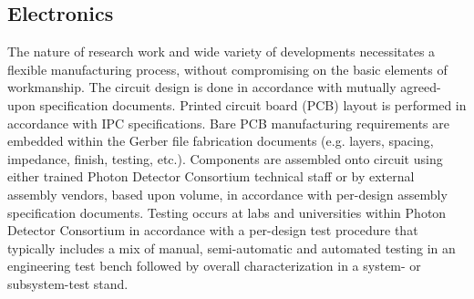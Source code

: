 






\subsection{Electronics}
\label{sec:fdsp-pd-assy-pde}

The nature of research work and wide variety of developments necessitates a flexible manufacturing process, without compromising on the basic elements of workmanship. The circuit design is done in accordance with mutually agreed-upon specification documents. Printed circuit board (PCB) layout is performed in accordance with IPC specifications. Bare PCB manufacturing requirements are embedded within the Gerber file fabrication documents (e.g. layers, spacing, impedance, finish, testing, etc.). Components are assembled onto circuit using either trained Photon Detector Consortium  technical staff or by external assembly vendors, based upon volume, in accordance with per-design assembly specification documents. Testing occurs at labs and universities within Photon Detector Consortium in accordance with a per-design test procedure that typically includes a mix of manual, semi-automatic and automated testing in an engineering test bench followed by overall characterization in a system- or subsystem-test stand.

